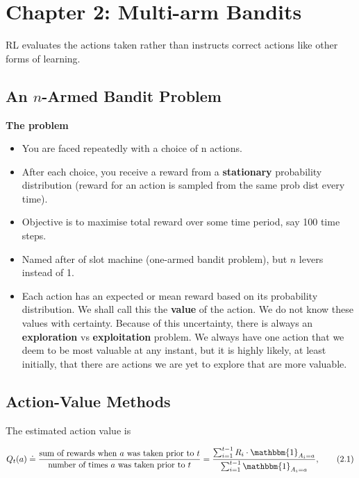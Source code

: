 \graphicspath{{./chapter2/}}

\section{Chapter 2: Multi-arm Bandits}
RL evaluates the actions taken rather than instructs correct actions like other forms of learning.
\subsection{An \(n\)-Armed Bandit Problem}
\textbf{The problem}

\begin{itemize}
\item You are faced repeatedly with a choice of n actions.

\item After each choice, you receive a reward from a \textbf{stationary} probability distribution (reward for an action is sampled from the same prob dist every time). 

\item Objective is to maximise total reward over some time period, say 100 time steps.

\item Named after of slot machine (one-armed bandit problem), but \(n\) levers instead of 1.

\item Each action has an expected or mean reward based on its probability distribution. We
shall call this the \textbf{value} of the action. We do not know these values with certainty.
Because of this uncertainty, there is always an \textbf{exploration} vs \textbf{exploitation} problem. We
always have one action that we deem to be most valuable at any instant, but it is highly
likely, at least initially, that there are actions we are yet to explore that are more valuable.

\end{itemize}






\subsection{Action-Value Methods}
The estimated action value is

\begin{equation}
Q_t(a) \doteq \frac{
    \text{sum of rewards when $a$ was taken prior to $t$}
}{
    \text{number of times $a$ was taken prior to $t$}
} = \frac{
\sum_{i=1}^{t-1} R_i \cdot \mathbbm{1}_{A_i = a}
}{
\sum_{i=1}^{t-1} \mathbbm{1}_{A_i = a}
},
\tag{2.1}
\end{equation}

